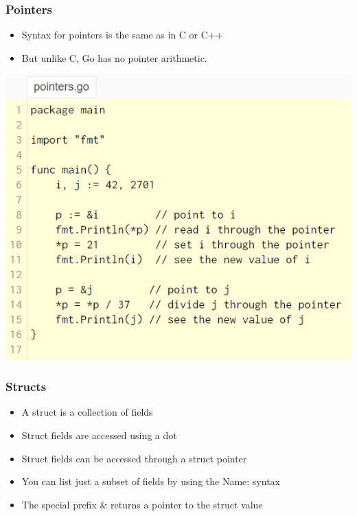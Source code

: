 \documentclass[14pt]{beamer}
\begin{document}
{
\begin{frame}
    \frametitle{Pointers}
    \begin{itemize}
        \item Syntax for pointers is the same as in C or C++
        \item But unlike C, Go has no pointer arithmetic.
    \end{itemize}
    \begin{center}
        \includegraphics[width=0.6\linewidth]{img/pointers.PNG}
    \end{center}
\end{frame}
}

{
\begin{frame}
    \frametitle{Structs}
    \begin{itemize}
        \item A struct is a collection of fields
        \item Struct fields are accessed using a dot
        \item Struct fields can be accessed through a struct pointer
        \item You can list just a subset of fields by using the Name: syntax
        \item The special prefix \& returns a pointer to the struct value
    \end{itemize}
\end{frame}
}
\end{document}
